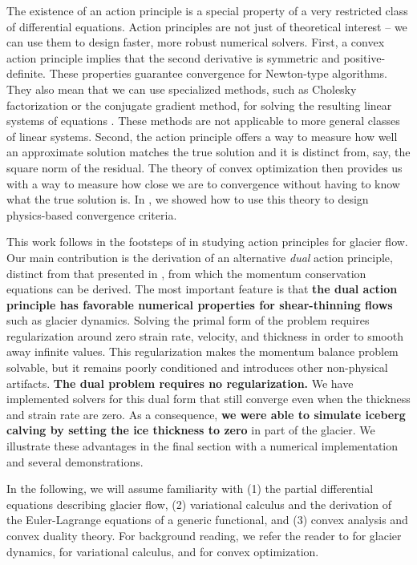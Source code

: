 \documentclass{article}
\theoremstyle{definition}
\theoremstyle{plain}
\begin{document}
The existence of an action principle is a special property of a very restricted class of differential equations.
Action principles are not just of theoretical interest -- we can use them to design faster, more robust numerical solvers.
First, a convex action principle implies that the second derivative is symmetric and positive-definite.
These properties guarantee convergence for Newton-type algorithms.
They also mean that we can use specialized methods, such as Cholesky factorization or the conjugate gradient method, for solving the resulting linear systems of equations \citep{nocedal2006numerical}.
These methods are not applicable to more general classes of linear systems.
Second, the action principle offers a way to measure how well an approximate solution matches the true solution and it is distinct from, say, the square norm of the residual.
The theory of convex optimization then provides us with a way to measure how close we are to convergence without having to know what the true solution is.
In \citet{shapero2021icepack}, we showed how to use this theory to design physics-based convergence criteria.

This work follows in the footsteps of \citet{dukowicz2010consistent} in studying action principles for glacier flow.
Our main contribution is the derivation of an alternative \emph{dual} action principle, distinct from that presented in \citet{dukowicz2010consistent}, from which the momentum conservation equations can be derived.
The most important feature is that \textbf{the dual action principle has favorable numerical properties for shear-thinning flows} such as glacier dynamics.
Solving the primal form of the problem requires regularization around zero strain rate, velocity, and thickness in order to smooth away infinite values.
This regularization makes the momentum balance problem solvable, but it remains poorly conditioned and introduces other non-physical artifacts.
\textbf{The dual problem requires no regularization.}
We have implemented solvers for this dual form that still converge even when the thickness and strain rate are zero.
As a consequence, \textbf{we were able to simulate iceberg calving by setting the ice thickness to zero} in part of the glacier.
We illustrate these advantages in the final section with a numerical implementation and several demonstrations.

In the following, we will assume familiarity with (1) the partial differential equations describing glacier flow, (2) variational calculus and the derivation of the Euler-Lagrange equations of a generic functional, and (3) convex analysis and convex duality theory.
For background reading, we refer the reader to \citet{greve2009dynamics} for glacier dynamics, \citet{weinstock1974calculus} for variational calculus, and \citet{boyd2004convex} for convex optimization.
\end{document}
